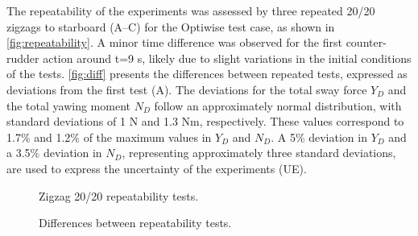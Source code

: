 \noindent The repeatability of the experiments was assessed by three repeated 20/20 zigzags to starboard (A--C) for the Optiwise test case, as shown in \autoref{fig:repeatability}. A minor time difference was observed for the first counter-rudder action around t=9 s, likely due to slight variations in the initial conditions of the tests. \autoref{fig:diff} presents the differences between repeated tests, expressed as deviations from the first test (A). The deviations for the total sway force $Y_D$ and the total yawing moment $N_D$ follow an approximately normal distribution, with standard deviations of 1 N and 1.3 Nm, respectively. These values correspond to 1.7\% and 1.2\% of the maximum values in $Y_D$ and $N_D$. A 5\% deviation in $Y_D$ and a 3.5\% deviation in $N_D$, representing approximately three standard deviations, are used to express the uncertainty of the experiments (UE).
\begin{figure}[h!]
    \centering   
    
    \caption{Zigzag 20/20 repeatability tests.}
    \label{fig:repeatability}
\end{figure}
\begin{figure}[h!]
    \centering   
    
    \caption{Differences between repeatability tests.}
    \label{fig:diff}
\end{figure}
%    
%
%    

